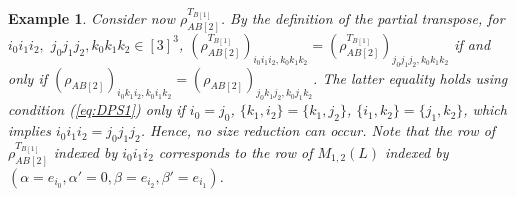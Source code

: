 \documentclass[11pt]{article}
\theoremstyle{plain}
\newtheorem{example}[satz]{Example}
\begin{document}
\begin{example}
Consider now $\rho_{AB[2]}^{T_{B[1]}}$. By the definition of the partial transpose, for   $i_0i_1i_2,$ $j_0j_1j_2,k_0k_1k_2\in [3]^3$,  $(\rho_{AB[2]}^{T_{B[1]}})_{i_0i_1i_2,k_0k_1k_2}=(\rho_{AB[2]}^{T_{B[1]}})_{j_0j_1j_2,k_0k_1k_2}$    if and only if 
$(\rho_{AB[2]})_{i_0k_1i_2,k_0i_1k_2}= (\rho_{AB[2]})_{j_0k_1j_2, k_0j_1k_2}$. The latter equality holds using condition (\ref{eq:DPS1})  only if $i_0=j_0$, $\{k_1,i_2\}=\{k_1,j_2\}$, $\{i_1,k_2\}=\{j_1,k_2\}$,
which implies $i_0i_1i_2=j_0j_1j_2$. Hence, no size reduction can occur.  Note that the row of $\rho_{AB[2]}^{T_{B[1]}}$ indexed by $i_0i_1i_2$ corresponds to the row of $M_{1,2}(L)$ indexed by $(\alpha=e_{i_0},\alpha'=0,\beta=e_{i_2},\beta'=e_{i_1})$.



\end{example}
\end{document}
